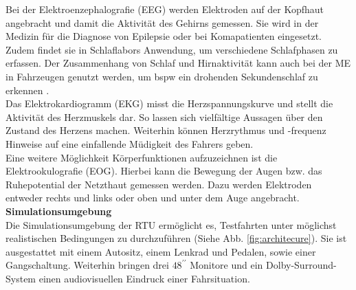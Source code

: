 {Bei der Elektroenzephalografie (EEG) werden Elektroden auf der Kopfhaut angebracht und damit die Aktivität des Gehirns gemessen. Sie wird in der Medizin für die Diagnose von Epilepsie oder bei Komapatienten eingesetzt. Zudem findet sie in Schlaflabors Anwendung, um verschiedene Schlafphasen zu erfassen. Der Zusammenhang von Schlaf und Hirnaktivität kann auch bei der \acl{ME} in Fahrzeugen genutzt werden, um \acl{bspw} ein drohenden Sekundenschlaf zu erkennen \cite{Santamaria_eeg}.\\

Das Elektrokardiogramm (EKG) misst die Herzspannungskurve und stellt die Aktivität des Herzmuskels dar. So lassen sich vielfältige Aussagen über den Zustand des Herzens machen. Weiterhin können Herzrythmus und -frequenz Hinweise auf eine einfallende Müdigkeit des Fahrers geben. \\

Eine weitere Möglichkeit Körperfunktionen aufzuzeichnen ist die Elektrookulografie (EOG). Hierbei kann die Bewegung der Augen bzw. das Ruhepotential der Netzthaut gemessen werden. Dazu werden Elektroden entweder rechts und links oder oben und unter dem Auge angebracht.\\


\textbf{Simulationsumgebung}\\
Die Simulationsumgebung der \acl{RTU} ermöglicht es, Testfahrten unter möglichst realistischen Bedingungen zu durchzuführen (Siehe Abb. \ref{fig:architecure}). 
Sie ist ausgestattet mit einem Autositz, einem Lenkrad und Pedalen, sowie einer Gangschaltung. Weiterhin bringen drei $48^{\prime\prime}$ Monitore und ein Dolby-Surround-System einen audiovisuellen Eindruck einer Fahrsituation.

}
